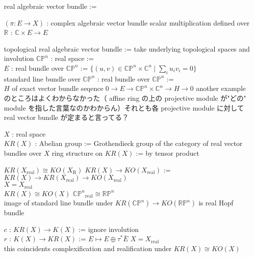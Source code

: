 \documentclass[dvipdfmx]{jsarticle}
\begin{document}
\begin{Definition}
\itemdefi
  \Define real algebraic vector bundle :=
  \begin{itemize}
    \itembase \((\pi : E \to X)\) : complex algebraic vector bundle
    \itemenum scalar multiplication defined over \(\mathbb{R}\) : \(\mathbb{C} \times E \to E\)
  \end{itemize}
  \Define topological real algebraic vector bundle := take underlying topological spaces and involution
\itemdefi
  \Let \(\mathbb{CP}^{n}\) : real space :=  \\
  \Let \(E\) : real bundle over \(\mathbb{CP}^{n}\) := \(\{(u,v) \in \mathbb{CP}^{n} \times \mathbb{C}^{n} \mid \sum_{i} u_{i} v_{i} = 0\}\) \\
  \Define standard line bundle over \(\mathbb{CP}^{n}\) : real bundle over \(\mathbb{CP}^{n}\) := \\
  \(H\) of exact vector bundle seqence \(0 \to E \to \mathbb{CP}^{n} \times \mathbb{C}^{n} \to H \to 0\)
\itemdefi
  \SORRY
  another example のところはよくわからなかった（ affine ring の上の projective module が"どの" module を指した言葉なのかわからん）それとも各 projective module に対して real vector bundle が定まると言ってる？
\end{Definition}

\begin{Definition}
\itemdefi
  \For \(X\) : real space \\
  \Define \(KR(X)\) : Abelian group := Grothendieck group of the category of real vector bundles over \(X\)
  \Define ring structure on \(KR(X)\) := by tensor product
\end{Definition}

\begin{Theorem}
\itemprop
  \Then \(KR(X_{\text{real}}) \cong KO(X_{\text{R}})\)
\itemprop
  \Let \(KR(X) \to KO(X_{\text{real}})\) := \(KR(X) \to KR(X_{\text{real}}) \to KO(X_{\text{real}})\) \\
  \IfHold \(X = X_{\text{real}}\) \\
  \Then \(KR(X) \cong KO(X)\)
\itemprop
  \Then \({\mathbb{CP}^{n}}_{\text{real}} \cong \mathbb{RP}^{n}\) \\
  \Then image of standard line bundle under \(KR(\mathbb{CP}^{n}) \to KO(\mathbb{RP}^{n})\) is real Hopf bundle
\end{Theorem}

\begin{Definition}
\itemdefi
  \Define \(c\) : \(KR(X) \to K(X)\) := ignore involution \\
  \Define \(r\) : \(K(X) \to KR(X)\) := \(E \mapsto E \oplus \tau^{*} \bar{E}\)
\itemprop
  \IfHold \(X = X_{\text{real}}\) \\
  \Then this coincidents complexification and realification under \(KR(X) \cong KO(X)\)
\end{Definition}
\end{document}
